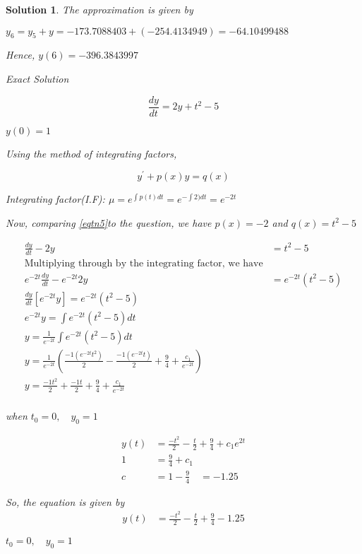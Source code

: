 \documentclass[12pt,a4paper]{article}
\newtheorem{solution}[theorem]{Solution}
\begin{document}
\begin{solution}
The approximation is given by 

$ y_6 = y_5 + y = -173.7088403 + (-254.4134949) = -64.10499488$

Hence, \quad $y(6) = -396.3843997$

Exact Solution

\begin{equation*}
\frac{dy}{dt} = 2y + t^2 - 5
\end{equation*}
\begin{center}
$ y(0)=1 $ \qquad
\end{center}

Using the method of integrating factors,

\begin{equation}\label{eqtn5}\tag{5}
y^\prime + p(x)y = q(x) 
\end{equation}

Integrating factor(I.F): $\mu = e^{\int p(t)dt} = e^{-\int 2)dt} = e^{-2t}$

Now, comparing \ref{eqtn5}to the question, we have $p(x) = -2$ and $q(x) = t^2 - 5$

\begin{align*}
\frac{dy}{dt} - 2y &= t^2 -5\\
\text{Multiplying through by the integrating factor, we have}\\
e^{-2t}\frac{dy}{dt} - e^{-2t}2y &= e^{-2t}\left( t^2 -5\right) \\
\frac{dy}{dt}\left[e^{-2t}y\right] = e^{-2t}\left( t^2 -5\right) \\
e^{-2t}y = \int e^{-2t}\left( t^2 -5\right) dt \\
y = \frac{1}{e^{-2t}}\int e^{-2t}\left( t^2 -5\right) dt \\
y = \frac{1}{e^{-2t}} \left(  \frac{-1(e^{-2t} t^2)}{2} - \frac{-1(e^{-2t} t)}{2} + \frac{9}{4}+ \frac{c_1}{e^{-2t}} \right) \\
y = \frac{-1 t^2}{2} + \frac{-1 t}{2} + \frac{9}{4} + \frac{c_1}{e^{-2t}} \\
\end{align*}

when $t_0 = 0, \quad y_0 = 1$

\begin{align*}
y(t) &= \frac{-t^2}{2} - \frac{t}{2} + \frac{9}{4} + c_1 e^{2t} \\
1 &= \frac{9}{4} + c_1 \\
c &= 1 - \frac{9}{4} \quad = -1.25
\end{align*}

So, the equation is given by 
\begin{align*}
y(t) &= \frac{-t^2}{2} - \frac{t}{2} + \frac{9}{4} - 1.25 
\end{align*}

$ t_0 = 0, \quad y_0 = 1 $



\end{solution}
\end{document}
